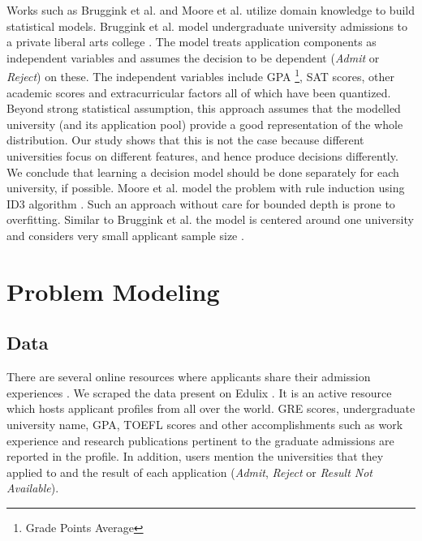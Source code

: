 \documentclass{sig-alternate-05-2015}
\begin{document}
Works such as Bruggink et al. and Moore et al. utilize domain knowledge to build statistical models\cite{bruggink, moore}. Bruggink et al. model undergraduate university admissions to a private liberal arts college \cite{bruggink}. The model treats application components as independent variables and assumes the decision to be dependent (\textit{Admit} or \textit{Reject}) on these. The independent variables include GPA \footnote{Grade Points Average}, SAT scores, other academic scores and extracurricular factors all of which have been quantized. Beyond strong statistical assumption, this approach assumes that the modelled university (and its application pool) provide a good representation of the whole distribution. Our study shows that this is not the case because different universities focus on different features, and hence produce decisions differently. We conclude that learning a decision model should be done separately for each university, if possible. Moore et al. model the problem with rule induction using ID3 algorithm \cite{moore}. Such an approach without care for bounded depth is prone to overfitting. Similar to Bruggink et al. the model is centered around one university and considers very small applicant sample size \cite{bruggink}.


\section{Problem Modeling}
\label{sec:problem-modeling}

\subsection{Data}
\label{subsec:dataset}
There are several online resources where applicants share their admission experiences \cite{edulix, gradcafe}. We scraped the data present on Edulix \cite{edulix}. It is an active resource which hosts applicant profiles from all over the world. GRE scores, undergraduate university name, GPA, TOEFL scores and other accomplishments such as work experience and research publications pertinent to the graduate admissions are reported in the profile. In addition, users mention the universities that they applied to and the result of each application (\textit{Admit}, \textit{Reject} or \textit{Result Not Available}).
\end{document}
